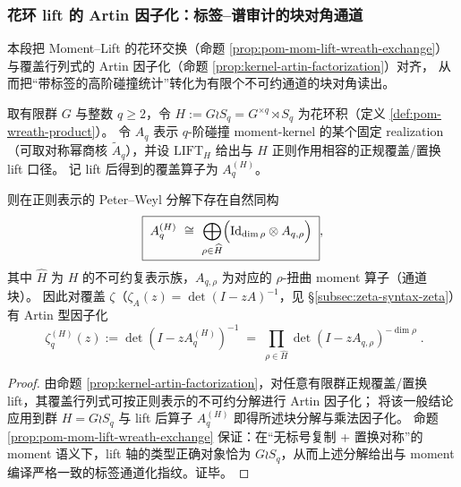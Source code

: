 \subsubsection{花环 lift 的 Artin 因子化：标签--谱审计的块对角通道}\label{subsubsec:pom-wreath-artin-factorization}
本段把 Moment--Lift 的花环交换（命题 \ref{prop:pom-mom-lift-wreath-exchange}）与覆盖行列式的 Artin 因子化（命题 \ref{prop:kernel-artin-factorization}）对齐，
从而把“带标签的高阶碰撞统计”转化为有限个不可约通道的块对角读出。

\begin{corollary}\label{cor:pom-wreath-artin-factorization}
取有限群 \(G\) 与整数 \(q\ge 2\)，令 \(H:=G\wr S_q=G^{\times q}\rtimes S_q\) 为花环积（定义 \ref{def:pom-wreath-product}）。
令 \(A_q\) 表示 \(q\)-阶碰撞 moment-kernel 的某个固定 realization（可取对称幂商核 \(\widetilde A_q\)），并设 \(\mathrm{LIFT}_H\) 给出与 \(H\) 正则作用相容的正规覆盖/置换 lift 口径。
记 lift 后得到的覆盖算子为 \(A_q^{(H)}\)。

则在正则表示的 Peter--Weyl 分解下存在自然同构
\[
\boxed{\;
A_q^{(H)}\ \cong\ \bigoplus_{\rho\in\widehat H}
\Bigl(\mathrm{Id}_{\dim\rho}\otimes A_{q,\rho}\Bigr)\; },
\]
其中 \(\widehat H\) 为 \(H\) 的不可约复表示族，\(A_{q,\rho}\) 为对应的 \(\rho\)-扭曲 moment 算子（通道块）。
因此对覆盖 \(\zeta\)（\(\zeta_{A}(z)=\det(I-zA)^{-1}\)，见 \S\ref{subsec:zeta-syntax-zeta}）有 Artin 型因子化
\[
\boxed{\;
\zeta_{q}^{(H)}(z)
:=\det(I-zA_q^{(H)})^{-1}
\;=\;
\prod_{\rho\in\widehat H}\det(I-zA_{q,\rho})^{-\dim\rho}\; }.
\]
\end{corollary}
\begin{proof}
由命题 \ref{prop:kernel-artin-factorization}，对任意有限群正规覆盖/置换 lift，其覆盖行列式可按正则表示的不可约分解进行 Artin 因子化；
将该一般结论应用到群 \(H=G\wr S_q\) 与 lift 后算子 \(A_q^{(H)}\) 即得所述块分解与乘法因子化。
命题 \ref{prop:pom-mom-lift-wreath-exchange} 保证：在“无标号复制 + 置换对称”的 moment 语义下，lift 轴的类型正确对象恰为 \(G\wr S_q\)，从而上述分解给出与 moment 编译严格一致的标签通道化指纹。证毕。
\end{proof}

